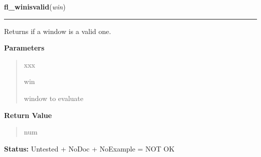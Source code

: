 \hspace{.8\funcindent}\begin{boxedminipage}{\funcwidth}

    \raggedright \textbf{fl\_winisvalid}(\textit{win})

    \vspace{-1.5ex}

    \rule{\textwidth}{0.5\fboxrule}
\setlength{\parskip}{2ex}
    Returns if a window is a valid one.

\setlength{\parskip}{1ex}
      \textbf{Parameters}
      \vspace{-1ex}

      \begin{quote}
        \begin{Ventry}{xxx}

          \item[win]

          window to evaluate

        \end{Ventry}

      \end{quote}

      \textbf{Return Value}
    \vspace{-1ex}

      \begin{quote}
      num

      \end{quote}

\textbf{Status:} Untested + NoDoc + NoExample = NOT OK



    \end{boxedminipage}

    \label{xformslib:library:fl_wintitle}

    \vspace{0.5ex}

